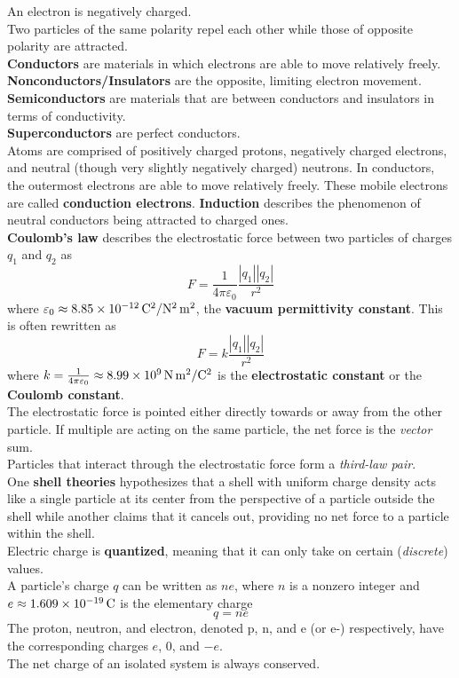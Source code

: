 \documentclass[./Electricity and Magnetism.tex]{subfiles}
\begin{document}
	An electron is negatively charged. \\
	Two particles of the same polarity repel each other while those of opposite polarity are attracted. \\
	\textbf{Conductors} are materials in which electrons are able to move relatively freely. \textbf{Nonconductors/Insulators} are the opposite, limiting electron movement. \\
	\textbf{Semiconductors} are materials that are between conductors and insulators in terms of conductivity. \\
	\textbf{Superconductors} are perfect conductors. \\
	Atoms are comprised of positively charged protons, negatively charged electrons, and neutral (though very slightly negatively charged) neutrons. In conductors, the outermost electrons are able to move relatively freely. These mobile electrons are called \textbf{conduction electrons}.
	\textbf{Induction} describes the phenomenon of neutral conductors being attracted to charged ones. \\
	\textbf{Coulomb's law} describes the electrostatic force between two particles of charges \(q_1\) and \(q_2\) as
		\[F = \frac{1}{4\pi\varepsilon_0}\frac{|q_1||q_2|}{r^2} \tag{Coulomb's Law}\]
		where \(\varepsilon_0 \approx \SI[per-mode = fraction]{8.85d-12}{C^2/N^2.m^2}\), the \textbf{vacuum permittivity constant}. This is often rewritten as
		\[F = k\frac{|q_1||q_2|}{r^2} \tag{Coulomb's Law}\]
		where \(k = \frac{1}{4\pi\varepsilon_0} \approx \SI{8.99d9}{N.m^2/C^2}\) is the \textbf{electrostatic constant} or the \textbf{Coulomb constant}. \\
		The electrostatic force is pointed either directly towards or away from the other particle. If multiple are acting on the same particle, the net force is the \textit{vector} sum. \\
		Particles that interact through the electrostatic force form a \textit{third-law pair}. \\
	One \textbf{shell theories} hypothesizes that a shell with uniform charge density acts like a single particle at its center from the perspective of a particle outside the shell while another claims that it cancels out, providing no net force to a particle within the shell. \\
	Electric charge is \textbf{quantized}, meaning that it can only take on certain (\textit{discrete}) values. \\
	A particle's charge \(q\) can be written as \(ne\), where \(n\) is a nonzero integer and \(e \approx \SI{1.609d-19}{C}\) is the elementary charge
		\[q = ne\]
		The proton, neutron, and electron, denoted p, n, and e (or e-) respectively, have the corresponding charges \(e\), \(0\), and \(-e\). \\
	The net charge of an isolated system is always conserved.
\end{document}
